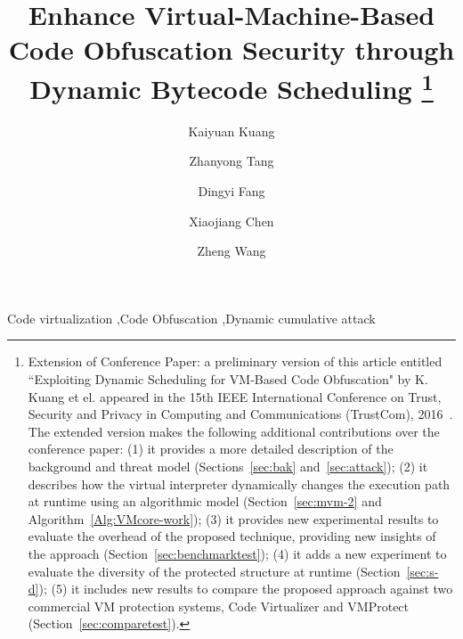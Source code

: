 \documentclass[preprint,12pt,3p]{elsarticle}
\begin{document}
\begin{frontmatter}

\title{
Enhance Virtual-Machine-Based Code Obfuscation Security through Dynamic Bytecode Scheduling
\footnote{
Extension of Conference Paper: a preliminary version of this article entitled ``Exploiting Dynamic Scheduling for
VM-Based Code Obfuscation" by K. Kuang et el. appeared in the 15th IEEE International Conference on Trust, Security and
Privacy in Computing and Communications (TrustCom), 2016~\cite{kuang2016exploiting}. The extended version makes the
following additional contributions over the conference paper: (1) it provides a more detailed description of the
background and threat model (Sections~\ref{sec:bak} and~\ref{sec:attack}); (2) it describes how the virtual interpreter
dynamically changes the execution path at runtime using an algorithmic model (Section~\ref{sec:mvm-2} and
Algorithm~\ref{Alg:VMcore-work}); (3) it provides new experimental results to evaluate the overhead of the proposed
technique, providing new insights of the approach (Section~\ref{sec:benchmarktest}); (4) it adds a new experiment to
evaluate the diversity of the protected structure at runtime (Section~\ref{sec:s-d}); (5) it includes new results to
compare the proposed approach against two
commercial VM protection systems, Code Virtualizer and VMProtect (Section~\ref{sec:comparetest}).
}
}

\author[label1]{Kaiyuan Kuang}
\address[label1]{School of Information Science and Technology, Northwest University, China.}
\address[label2]{School of Computing and Communications, Lancaster University, UK}%




\author[label1]{Zhanyong Tang}

\author[label1]{Dingyi Fang}

\author[label1]{Xiaojiang Chen}

\author[label2]{Zheng Wang}



\begin{keyword}
Code virtualization \sep Code Obfuscation \sep Dynamic cumulative attack
\end{keyword}

\end{frontmatter}
\end{document}
